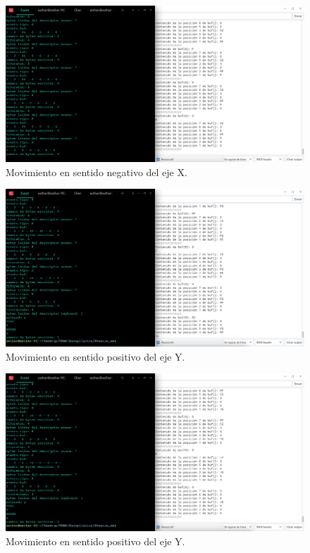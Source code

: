     \begin{figure}
    \centering
    \includegraphics[scale = 0.5]{capitulo_04/figuras_dir/movx-.jpg}
    \caption{Movimiento en sentido negativo del eje X.}
    \end{figure}

    \begin{figure}
    \centering
    \includegraphics[scale = 0.45]{capitulo_04/figuras_dir/movy+.jpg}
    \caption{Movimiento en sentido positivo del eje Y.}
    \end{figure}

    \begin{figure}
    \centering
    \includegraphics[scale = 0.45]{capitulo_04/figuras_dir/movy-.jpg}
    \caption{Movimiento en sentido positivo del eje Y.}
    \end{figure}


